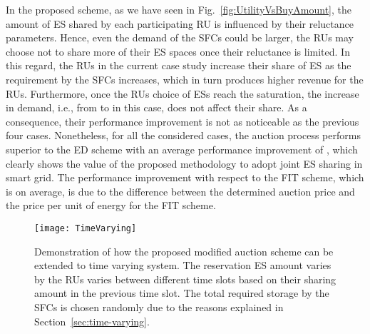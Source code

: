 \documentclass[journal,10pt]{IEEEtran}
\begin{document}
In the proposed scheme, as we have seen in Fig.~\ref{fig:UtilityVsBuyAmount}, the amount of ES shared by each participating RU is influenced by their reluctance parameters. Hence, even the demand of the SFCs could be larger, the RUs may choose not to share more of their ES spaces once their reluctance is limited. In this regard, the RUs in the current case study increase their share of ES as the requirement by the  SFCs increases, which in turn produces higher revenue for the RUs. Furthermore, once the RUs choice of ESs reach the saturation, the increase in demand, i.e., from  to  in this case, does not affect their share. As a consequence, their performance improvement is not as noticeable as the previous four cases. Nonetheless, for all the considered cases, the auction process performs superior to the ED scheme with an average performance improvement of , which clearly shows the value of the proposed methodology to adopt joint ES sharing in smart grid. The performance improvement with respect to the FIT scheme, which is  on average, is due to the difference between the determined auction price and the price per unit of energy for the FIT scheme.
\begin{figure}[t!]
\centering
\texttt{[image: TimeVarying]}
\caption{Demonstration of how the proposed modified auction scheme can be extended to time varying system. The reservation ES amount varies by the RUs varies between different time slots based on their sharing amount in the previous time slot. The total required storage by the SFCs is chosen randomly due to the reasons explained in Section~\ref{sec:time-varying}.} \label{fig:time-varying}
\end{figure}
\end{document}
